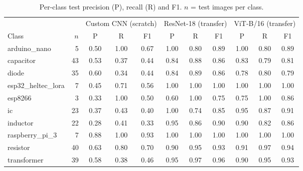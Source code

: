 \begin{table}[H]\centering\scriptsize\setlength{\tabcolsep}{3pt}
\caption{Per-class test precision (P), recall (R) and F1. $n$ = test images per class.}\label{tab:perclass}
\begin{tabular}{lrccccccccc}\toprule
 & & \multicolumn{3}{c}{Custom CNN (scratch)} & \multicolumn{3}{c}{ResNet-18 (transfer)} & \multicolumn{3}{c}{ViT-B/16 (transfer)} \\
Class & $n$ & P & R & F1 & P & R & F1 & P & R & F1 \\\midrule
arduino\_nano & 5 & 0.50 & 1.00 & 0.67 & 1.00 & 0.80 & 0.89 & 1.00 & 0.80 & 0.89 \\
capacitor & 43 & 0.53 & 0.37 & 0.44 & 0.84 & 0.88 & 0.86 & 0.83 & 0.79 & 0.81 \\
diode & 35 & 0.60 & 0.34 & 0.44 & 0.84 & 0.89 & 0.86 & 0.78 & 0.80 & 0.79 \\
esp32\_heltec\_lora & 7 & 0.45 & 0.71 & 0.56 & 1.00 & 1.00 & 1.00 & 1.00 & 1.00 & 1.00 \\
esp8266 & 3 & 0.33 & 1.00 & 0.50 & 0.60 & 1.00 & 0.75 & 0.75 & 1.00 & 0.86 \\
ic & 23 & 0.37 & 0.43 & 0.40 & 1.00 & 0.74 & 0.85 & 0.95 & 0.87 & 0.91 \\
inductor & 22 & 0.28 & 0.41 & 0.33 & 0.95 & 0.86 & 0.90 & 0.90 & 0.82 & 0.86 \\
raspberry\_pi\_3 & 7 & 0.88 & 1.00 & 0.93 & 1.00 & 1.00 & 1.00 & 1.00 & 1.00 & 1.00 \\
resistor & 40 & 0.63 & 0.80 & 0.70 & 0.90 & 0.95 & 0.93 & 0.91 & 0.97 & 0.94 \\
transformer & 39 & 0.58 & 0.38 & 0.46 & 0.95 & 0.97 & 0.96 & 0.90 & 0.95 & 0.93 \\
\bottomrule\end{tabular}\end{table}